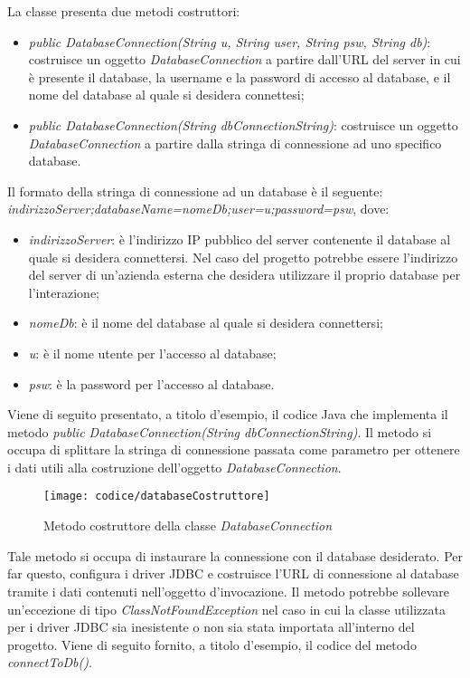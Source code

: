 La classe presenta due metodi costruttori:
\begin{itemize}
	\item \textit{public DatabaseConnection(String u, String user, String psw, String db)}: costruisce un oggetto \textit{DatabaseConnection} a partire dall'URL del server in cui è presente il database, la username e la password di accesso al database, e il nome del database al quale si desidera connettesi;
	\item \textit{public DatabaseConnection(String dbConnectionString)}: costruisce un oggetto \textit{DatabaseConnection} a partire dalla stringa di connessione ad uno specifico database.
\end{itemize}
Il formato della stringa di connessione ad un database è il seguente: \textit{indirizzoServer;databaseName=nomeDb;user=u;password=psw}, dove:
\begin{itemize}
	\item \textit{indirizzoServer}: è l'indirizzo IP pubblico del server contenente il database al quale si desidera connettersi. Nel caso del progetto potrebbe essere l'indirizzo del server di un'azienda esterna che desidera utilizzare il proprio database per l'interazione;
	\item \textit{nomeDb}: è il nome del database al quale si desidera connettersi;
	\item \textit{u}: è il nome utente per l'accesso al database;
	\item \textit{psw}: è la password per l'accesso al database.
\end{itemize}
Viene di seguito presentato, a titolo d'esempio, il codice Java che implementa il metodo \textit{public DatabaseConnection(String dbConnectionString)}. Il metodo si occupa di splittare la stringa di connessione passata come parametro per ottenere i dati utili alla costruzione dell'oggetto \textit{DatabaseConnection}.

\begin{figure}[!h] 
    \centering 
    \texttt{[image: codice/databaseCostruttore]} 
    \caption{Metodo costruttore della classe \textit{DatabaseConnection}}
\end{figure}


Tale metodo si occupa di instaurare la connessione con il database desiderato. Per far questo, configura i driver JDBC e costruisce l'URL di connessione al database tramite i dati contenuti nell'oggetto d'invocazione. Il metodo potrebbe sollevare un'eccezione di tipo \textit{ClassNotFoundException} nel caso in cui la classe utilizzata per i driver JDBC sia inesistente o non sia stata importata all'interno del progetto. Viene di seguito fornito, a titolo d'esempio, il codice del metodo \textit{connectToDb()}.

